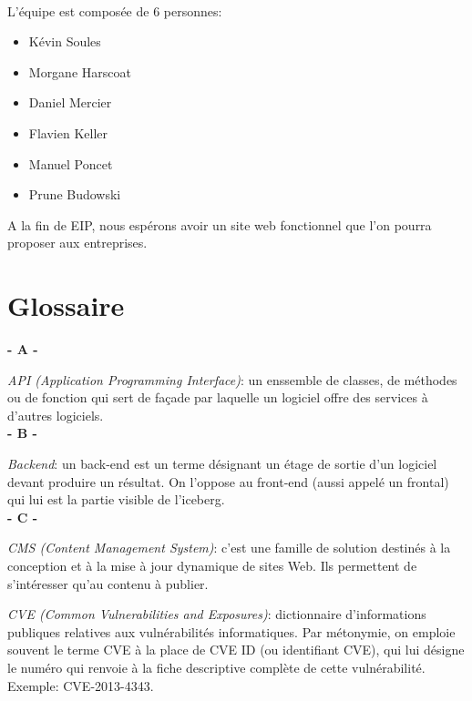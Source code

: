 \\
L’équipe est composée de 6 personnes:\\
\begin{itemize}
\item Kévin Soules\\
\item Morgane Harscoat\\
\item Daniel Mercier\\
\item Flavien Keller\\
\item Manuel Poncet\\
\item Prune Budowski\\
\end{itemize}


A la fin de EIP, nous espérons avoir un site web fonctionnel que l’on pourra proposer aux entreprises.

\section{Glossaire}
\noindent

\vskip 0.1cm
\textbf{- A -}\\
\vskip 0.1cm

\textit{API (Application Programming Interface)}: un enssemble de classes, de méthodes ou de fonction qui sert de façade par laquelle un logiciel offre des services à d'autres logiciels.\\

\vskip 0.1cm
\textbf{- B -}\\
\vskip 0.1cm

\textit{Backend}: un back-end est un terme désignant un étage de sortie d'un logiciel devant produire un résultat. On l'oppose au front-end (aussi appelé un frontal) qui lui est la partie visible de l'iceberg.\\

\vskip 0.1cm
\textbf{- C -}\\
\vskip 0.1cm

\textit{CMS (Content Management System)}: c'est une famille de solution destinés à la conception et à la mise à jour dynamique de sites Web. Ils permettent de s'intéresser qu'au contenu à publier.

\textit{CVE (Common Vulnerabilities and Exposures)}: dictionnaire d'informations publiques relatives aux vulnérabilités informatiques. Par métonymie, on emploie souvent le terme CVE à la place de CVE ID (ou identifiant CVE), qui lui désigne le numéro qui renvoie à la fiche descriptive complète de cette vulnérabilité. Exemple: CVE-2013-4343.\\

